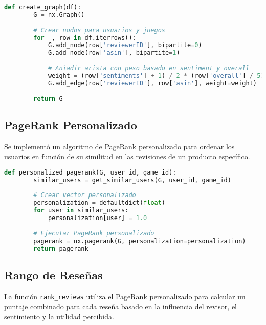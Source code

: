 \documentclass{llncs}
\begin{document}
    \begin{lstlisting}[language=Python, caption=Función para crear el grafo]
    def create_graph(df):
        G = nx.Graph()
        
        # Crear nodos para usuarios y juegos
        for _, row in df.iterrows():
            G.add_node(row['reviewerID'], bipartite=0)
            G.add_node(row['asin'], bipartite=1)
            
            # Aniadir arista con peso basado en sentiment y overall
            weight = (row['sentiments'] + 1) / 2 * (row['overall'] / 5)  # Normalizar a [0, 1]
            G.add_edge(row['reviewerID'], row['asin'], weight=weight)
        
        return G
    \end{lstlisting}
    
    \subsection{PageRank Personalizado}
    Se implementó un algoritmo de PageRank personalizado para ordenar los usuarios en función de su similitud en las revisiones de un producto específico.
    
    \begin{lstlisting}[language=Python, caption=Función de PageRank personalizado]
    def personalized_pagerank(G, user_id, game_id):
        similar_users = get_similar_users(G, user_id, game_id)
        
        # Crear vector personalizado
        personalization = defaultdict(float)
        for user in similar_users:
            personalization[user] = 1.0
        
        # Ejecutar PageRank personalizado
        pagerank = nx.pagerank(G, personalization=personalization)
        return pagerank
    \end{lstlisting}
    
    \subsection{Rango de Reseñas}
    La función \texttt{rank\_reviews} utiliza el PageRank personalizado para calcular un puntaje combinado para cada reseña basado en la influencia del revisor, el sentimiento y la utilidad percibida.
    
\end{document}
